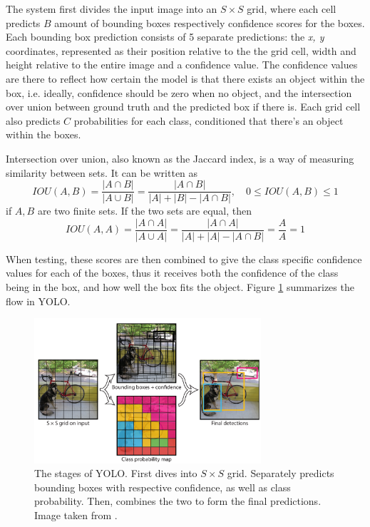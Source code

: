  The system first divides the input image into an  $S \times S$  grid, where each cell predicts $B$ amount of bounding boxes respectively confidence scores for the boxes. Each bounding box prediction consists of 5 separate predictions: the \textit{x, y} coordinates, represented as their position relative to the the grid cell, width and height relative to the entire image and a confidence value. The confidence values are there to reflect how certain the model is that there exists an object within the box, i.e. ideally, confidence should be zero when no object, and the intersection over union between ground truth and the predicted box if there is. Each grid cell also predicts $C$ probabilities for each class, conditioned that there's an object within the boxes. 
 
 Intersection over union, also known as the Jaccard index, is a way of measuring similarity between sets. It can be written as 
 \[
IOU(A,B) =  \frac{|A\cap B |}{|A\cup B|} =\frac{|A\cap B|}{|A| + |B| - |A \cap B|}
, \quad 0\leq IOU(A,B) \leq 1
 \]
 if $A,B$ are two finite sets. If the two sets are equal, then \[ IOU(A,A) =  \frac{|A\cap A |}{|A\cup A|} = \frac{|A\cap A|}{|A| + |A| - |A \cap B|}  = \frac{A}{A} = 1 \]
 
 When testing, these scores are then combined to give the class specific confidence values for each of the boxes, thus it receives both the confidence of the class being in the box, and how well the box fits the object. Figure \ref{fig:YOLO_stages} summarizes the flow in YOLO. 
\begin{figure}[hbtp]
\begin{center}
\includegraphics[width = 0.75\textwidth]{./Images/YOLO_stages.PNG} 
\caption{The stages of YOLO. First dives into $S \times S$ grid. Separately predicts bounding boxes with respective confidence, as well as class probability. Then, combines the two to form the final predictions. Image taken from \cite{YOLO1}.}
\label{fig:YOLO_stages}
\end{center}
\end{figure}

